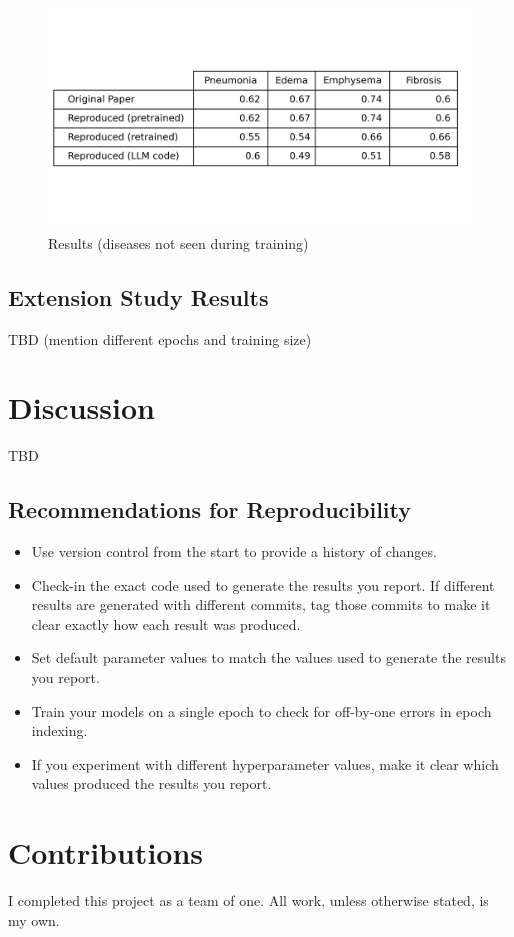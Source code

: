 \documentclass[letterpaper]{article} %
\begin{document}
\begin{figure}[h!]
\centering
\includegraphics[width=0.9\columnwidth]{unseen.png}
\caption{Results (diseases not seen during training)}
\label{fig:unseen}
\end{figure}

\subsection{Extension Study Results}

TBD (mention different epochs and training size)

\section{Discussion}

TBD

\subsection{Recommendations for Reproducibility}

\begin{itemize}
    \item Use version control from the start to provide a history of changes.
    \item Check-in the exact code used to generate the results you report. If different results are generated with different commits, tag those commits to make it clear exactly how each result was produced.
    \item Set default parameter values to match the values used to generate the results you report.
    \item Train your models on a single epoch to check for off-by-one errors in epoch indexing.
    \item If you experiment with different hyperparameter values, make it clear which values produced the results you report.
\end{itemize}

\section{Contributions}

I completed this project as a team of one. All work, unless otherwise stated, is my own.


\end{document}
